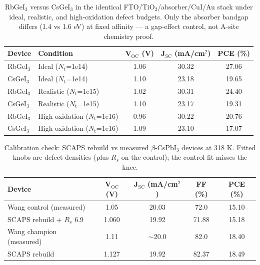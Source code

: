 \documentclass[12pt]{article}
\begin{document}
\begin{table}[htbp]
\centering
{\footnotesize\setlength{\tabcolsep}{3pt}
\begin{tabularx}{\textwidth}{XXccc}
\hline
Device & Condition & V$_{\mathrm{OC}}$ (V) & J$_{\mathrm{SC}}$ (mA/cm$^{2}$) & PCE (\%)
\\\hline
RbGeI$_{3}$ & Ideal ($N_{\mathrm{t}}$=1e14) & 1.06 & 30.32 & 27.06\\
CsGeI$_{3}$ & Ideal ($N_{\mathrm{t}}$=1e14) & 1.10 & 23.18 & 19.65\\
RbGeI$_{3}$ & Realistic ($N_{\mathrm{t}}$=1e15) & 1.02 & 30.31 & 24.40\\
CsGeI$_{3}$ & Realistic ($N_{\mathrm{t}}$=1e15) & 1.10 & 23.17 & 19.31\\
RbGeI$_{3}$ & High oxidation ($N_{\mathrm{t}}$=1e16) & 0.96 & 30.22 & 20.76\\
CsGeI$_{3}$ & High oxidation ($N_{\mathrm{t}}$=1e16) & 1.09 & 23.10 & 17.07\\
\hline
\end{tabularx}
}
\caption{RbGeI$_{3}$ versus CsGeI$_{3}$ in the identical FTO/\allowbreak{}TiO$_{2}$/absorber/CuI/\allowbreak{}Au stack under ideal, realistic, and high-oxidation defect budgets. Only the absorber bandgap differs (1.4 vs 1.6 eV) at fixed affinity --- a gap-effect control, not A-site chemistry proof.}
\end{table}

\begin{table}[htbp]
\centering
{\footnotesize\setlength{\tabcolsep}{3pt}
\begin{tabularx}{\textwidth}{Xcccc}
\hline
Device & V$_{\mathrm{OC}}$ (V) & J$_{\mathrm{SC}}$ (mA/cm$^{2}$) & FF (\%) & PCE (\%)
\\\hline
Wang control (measured) & 1.05 & 20.03 & 72.0 & 15.10\\
SCAPS rebuild + $R_{s}$ 6.9 & 1.060 & 19.92 & 71.88 & 15.18\\
Wang champion (measured) & 1.11 & $\sim$20.0 & 82.0 & 18.40\\
SCAPS rebuild & 1.127 & 19.92 & 82.37 & 18.49\\
\hline
\end{tabularx}
}
\caption{Calibration check: SCAPS rebuild vs measured $\beta$-CsPbI$_{3}$ devices \cite{rWang} at 318 K. Fitted knobs are defect densities (plus $R_{s}$ on the control); the control fit misses the knee.}
\end{table}
\end{document}
